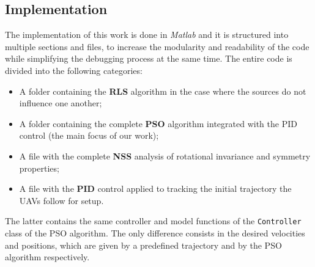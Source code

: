 \documentclass[main]{subfiles}
\begin{document}
\subsection{Implementation}
The implementation of this work is done in \textit{Matlab} and it
is structured into multiple sections and files, to increase the modularity and 
readability of the code while simplifying the debugging process at the same time. 
The entire code is divided into the following categories:
\begin{itemize}
    \item A folder containing the \textbf{RLS} algorithm in the case where the sources
 do not influence one another;
    \item A folder containing the complete \textbf{PSO} algorithm integrated with 
 the PID control (the main focus of our work);
    \item A file with the complete \textbf{NSS} analysis of rotational invariance
 and symmetry properties;
    \item A file with the \textbf{PID} control applied to tracking the initial trajectory
 the UAVs follow for setup.
\end{itemize}
The latter contains the same controller and model functions of the \texttt{Controller}
class of the PSO algorithm. The only difference consists in the desired velocities and positions, 
which are given by a predefined trajectory and by the PSO algorithm
respectively.
\end{document}
